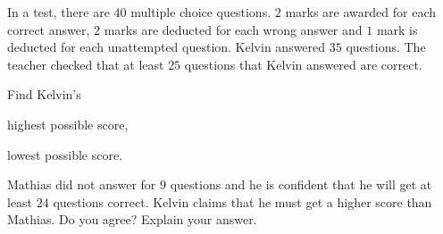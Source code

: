  In a test, there are $40$ multiple choice questions. $2$ marks are awarded for each correct answer, $2$ marks are deducted for each wrong answer and $1$ mark is deducted for each unattempted question. Kelvin answered $35$ questions. The teacher checked that at least $25$ questions that Kelvin answered are correct.

\begin{subparts}
  \item Find Kelvin's
  \begin{subpartsii}[1]
    \item highest possible score,
    \item lowest possible score.
  \end{subpartsii}

  \item Mathias did not answer for $9$ questions and he is confident that he will get at least $24$ questions correct. Kelvin claims that he must get a higher score than Mathias. Do you agree? Explain your answer.
\end{subparts}


